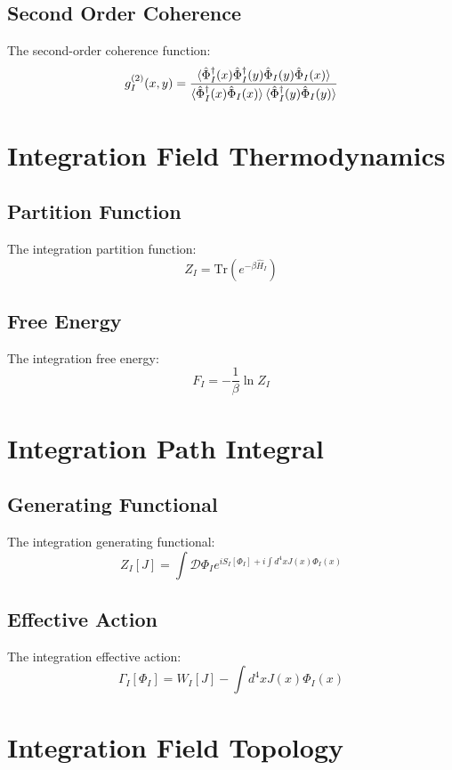 \documentclass[12pt]{article}
\begin{document}
\subsection{Second Order Coherence}
The second-order coherence function:
\begin{equation}
g_I^{(2)}(x,y) = \frac{\braket{\hat{\Phi}_I^\dagger(x)\hat{\Phi}_I^\dagger(y)\hat{\Phi}_I(y)\hat{\Phi}_I(x)}}{\braket{\hat{\Phi}_I^\dagger(x)\hat{\Phi}_I(x)}\braket{\hat{\Phi}_I^\dagger(y)\hat{\Phi}_I(y)}}
\end{equation}
\section{Integration Field Thermodynamics}
\subsection{Partition Function}
The integration partition function:
\begin{equation}
Z_I = \text{Tr}(e^{-\beta\hat{H}_I})
\end{equation}
\subsection{Free Energy}
The integration free energy:
\begin{equation}
F_I = -\frac{1}{\beta}\ln Z_I
\end{equation}
\section{Integration Path Integral}
\subsection{Generating Functional}
The integration generating functional:
\begin{equation}
Z_I[J] = \int \mathcal{D}\Phi_I e^{iS_I[\Phi_I] + i\int d^4x J(x)\Phi_I(x)}
\end{equation}
\subsection{Effective Action}
The integration effective action:
\begin{equation}
\Gamma_I[\Phi_I] = W_I[J] - \int d^4x J(x)\Phi_I(x)
\end{equation}
\section{Integration Field Topology}
\end{document}
